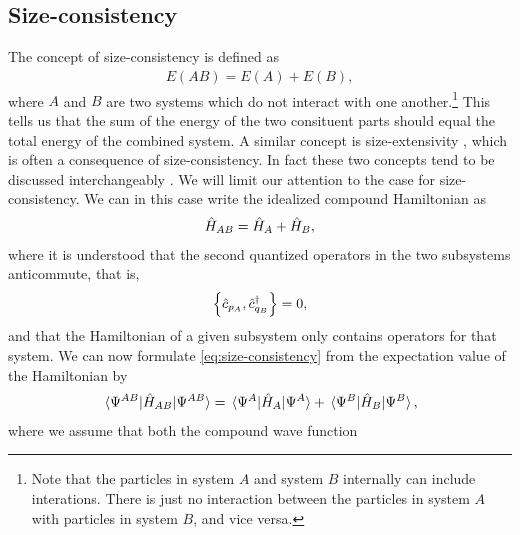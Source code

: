         \subsection{Size-consistency}
            \label{subsec:size-consistency}
            The concept of size-consistency is defined as
            \cite{pople-size-consistency}
            \begin{align}
                E(AB) = E(A) + E(B),
                \label{eq:size-consistency}
            \end{align}
            where $A$ and $B$ are two systems which do not interact with one
            another.\footnote{%
                Note that the particles in system $A$ and system $B$ internally
                can include interations.
                There is just no interaction between the particles in system $A$
                with particles in system $B$, and vice versa.
            }
            This tells us that the sum of the energy of the two consituent parts
            should equal the total energy of the combined system.
            A similar concept is size-extensivity \cite{shavitt2009many}, which
            is often a consequence of size-consistency.
            In fact these two concepts tend to be discussed interchangeably
            \cite{size-extensivity, helgaker-molecular}.
            We will limit our attention to the case for size-consistency.
            We can in this case write the idealized compound Hamiltonian as
            \begin{align}
                \hat{H}_{AB}
                = \hat{H}_A + \hat{H}_B,
            \end{align}
            where it is understood that the second quantized operators in the
            two subsystems anticommute, that is,
            \begin{align}
                \left\{\hat{c}_{{p_A}}, \hat{c}_{{q_B}}^{\dagger}\right\} = 0,
            \end{align}
            and that the Hamiltonian of a given subsystem only contains
            operators for that system.
            We can now formulate \autoref{eq:size-consistency} from the
            expectation value of the Hamiltonian by
            \begin{align}
                \mel*{\Psi^{AB}}{\hat{H}_{AB}}{\Psi^{AB}}
                = \mel*{\Psi^{A}}{\hat{H}_{A}}{\Psi^{A}}
                + \mel*{\Psi^{B}}{\hat{H}_{B}}{\Psi^{B}},
            \end{align}
            where we assume that both the compound wave function
